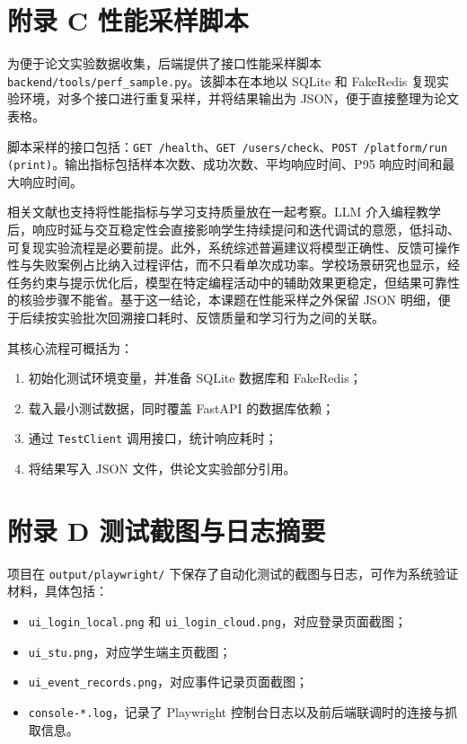 \section*{附录 C 性能采样脚本}\label{ux9644ux5f55-c-ux6027ux80fdux91c7ux6837ux811aux672c}

为便于论文实验数据收集，后端提供了接口性能采样脚本 \texttt{backend/tools/perf\_sample.py}。该脚本在本地以 SQLite 和 FakeRedis 复现实验环境，对多个接口进行重复采样，并将结果输出为 JSON，便于直接整理为论文表格。

脚本采样的接口包括：\texttt{GET /health}、\texttt{GET /users/check}、\texttt{POST /platform/run (print)}。输出指标包括样本次数、成功次数、平均响应时间、P95 响应时间和最大响应时间。

相关文献也支持将性能指标与学习支持质量放在一起考察。LLM 介入编程教学后，响应时延与交互稳定性会直接影响学生持续提问和迭代调试的意愿，低抖动、可复现实验流程是必要前提\cite{pitts2025llmprogedu,ma2024teachableagent}。此外，系统综述普遍建议将模型正确性、反馈可操作性与失败案例占比纳入过程评估，而不只看单次成功率\cite{raihan2025cseduslr,pirzado2024pitfalls}。学校场景研究也显示，经任务约束与提示优化后，模型在特定编程活动中的辅助效果更稳定，但结果可靠性的核验步骤不能省\cite{tang2025middleschool,gonzalez2025k12gpt}。基于这一结论，本课题在性能采样之外保留 JSON 明细，便于后续按实验批次回溯接口耗时、反馈质量和学习行为之间的关联。

其核心流程可概括为：

\begin{enumerate}
  \item 初始化测试环境变量，并准备 SQLite 数据库和 FakeRedis；
  \item 载入最小测试数据，同时覆盖 FastAPI 的数据库依赖；
  \item 通过 \texttt{TestClient} 调用接口，统计响应耗时；
  \item 将结果写入 JSON 文件，供论文实验部分引用。
\end{enumerate}

\section*{附录 D 测试截图与日志摘要}\label{ux9644ux5f55-d-ux6d4bux8bd5ux622aux56feux4e0eux65e5ux5fd7ux6458ux8981}

项目在 \texttt{output/playwright/} 下保存了自动化测试的截图与日志，可作为系统验证材料，具体包括：

\begin{itemize}
  \item \texttt{ui\_login\_local.png} 和 \texttt{ui\_login\_cloud.png}，对应登录页面截图；
  \item \texttt{ui\_stu.png}，对应学生端主页截图；
  \item \texttt{ui\_event\_records.png}，对应事件记录页面截图；
  \item \texttt{console-*.log}，记录了 Playwright 控制台日志以及前后端联调时的连接与抓取信息。
\end{itemize}

